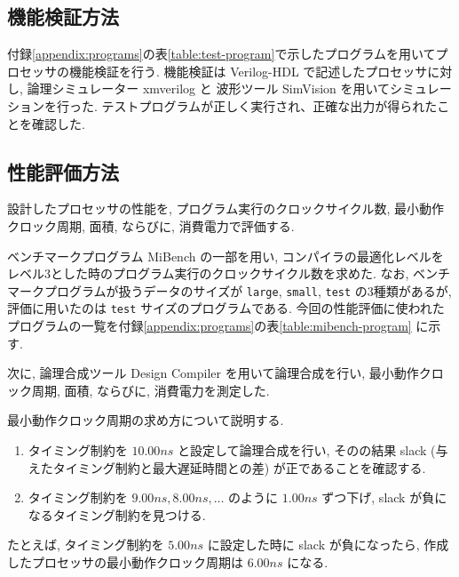 \documentclass[../main.tex]{subfiles}
\begin{document}
  \subsection{機能検証方法}
  付録\ref{appendix:programs}の表\ref{table:test-program}で示したプログラムを用いてプロセッサの機能検証を行う.
  機能検証は Verilog-HDL で記述したプロセッサに対し, 
  論理シミュレーター xmverilog と
  波形ツール SimVision を用いてシミュレーションを行った.
  テストプログラムが正しく実行され、正確な出力が得られたことを確認した.

  \subsection{性能評価方法}
  設計したプロセッサの性能を, プログラム実行のクロックサイクル数, 
  最小動作クロック周期, 面積, ならびに, 消費電力で評価する.

  ベンチマークプログラム MiBench \cite{mibench} の一部を用い, 
  コンパイラの最適化レベルをレベル3とした時のプログラム実行のクロックサイクル数を求めた.
  なお, ベンチマークプログラムが扱うデータのサイズが \verb|large|, \verb|small|, \verb|test| の3種類があるが, 
  評価に用いたのは \verb|test| サイズのプログラムである.
  今回の性能評価に使われたプログラムの一覧を付録\ref{appendix:programs}の表\ref{table:mibench-program} に示す.

  次に, 論理合成ツール Design Compiler を用いて論理合成を行い, 
  最小動作クロック周期, 面積, ならびに, 消費電力を測定した.

  最小動作クロック周期の求め方について説明する.
  \begin{enumerate}
    \item タイミング制約を $10.00\unit{ns}$ と設定して論理合成を行い, 
    そのの結果 slack (与えたタイミング制約と最大遅延時間との差) が正であることを確認する.
    \item タイミング制約を $9.00\unit{ns}, 8.00\unit{ns}, \ldots$ のように $1.00\unit{ns}$ ずつ下げ, 
    slack が負になるタイミング制約を見つける.
  \end{enumerate}

  たとえば, タイミング制約を $5.00\unit{ns}$ に設定した時に slack が負になったら, 
  作成したプロセッサの最小動作クロック周期は $6.00\unit{ns}$ になる.

\end{document}
